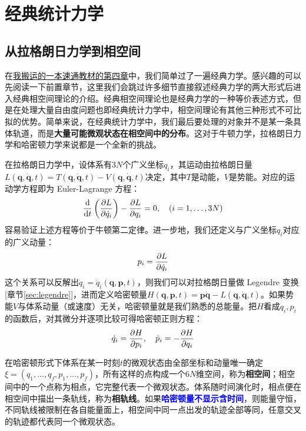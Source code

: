 \section{经典统计力学}
\subsection{从拉格朗日力学到相空间}
在\href{https://github.com/Astolfo-Official/Baby-Math-on-Quantum-Chemistry/blob/main/%E3%80%8A%E9%87%8F%E5%AD%90%E5%8C%96%E5%AD%A6%E4%B8%AD%E7%9A%84%E6%95%B0%E5%AD%A6%E3%80%8B2.0.pdf}{我搬运的一本速通教材的第四章}中，我们简单过了一遍经典力学。感兴趣的可以先阅读一下前置章节，这里我们会跳过许多细节直接叙述经典力学的两大形式后进入经典相空间理论的介绍。经典相空间理论也是经典力学的一种等价表述方式，但是在处理大量自由度问题也即经典统计力学中，相空间理论有其他三种形式不可比拟的优势。简单来说，在经典统计力学中，我们最后要处理的对象并不是某一条具体轨道，而是\textbf{大量可能微观状态在相空间中的分布}。这对于牛顿力学，拉格朗日力学和哈密顿力学来说都是一个全新的挑战。

在拉格朗日力学中，设体系有$3N$个广义坐标$q_i$，其运动由拉格朗日量$L(\bm{q},\dot{\bm{q}},t)=T(\bm{q},\dot{\bm{q}},t)-V(\bm{q},\dot{\bm{q}},t)$决定，其中$T$是动能，$V$是势能。对应的运动学方程即为 Euler-Lagrange 方程：
\[\dv{}{t}\left(\pdv{L}{\dot{q}_i}\right)-\pdv{L}{q_i}=0,\quad (i=1,\ldots,3N)\]
容易验证上述方程等价于牛顿第二定律。进一步地，我们还定义与广义坐标$q_i$对应的广义动量：
\[p_i=\pdv{L}{\dot{q}_i}\]
这个关系可以反解出$\dot{q}_i=\dot{q}_i(\bm{q},\bm{p},t)$，则我们可以对拉格朗日量做 Legendre 变换 [章节\ref{sec:legendre}]，进而定义哈密顿量$H(\bm{q},\bm{p},t)=\bm{p}\dot{\bm{q}}-L(\bm{q},\dot{\bm{q}},t)$。如果势能$V$与体系动量（或速度）无关，哈密顿量就是我们熟悉的总能量。把$H$看成$q_i,p_i$的函数后，对其微分并逐项比较可得哈密顿正则方程：
\[\dot{q}_i=\pdv{H}{p_i},\quad \dot{p}_i=-\pdv{H}{q_i}\]

在哈密顿形式下体系在某一时刻$t$的微观状态由全部坐标和动量唯一确定$\xi=(q_1,\ldots,q_f,p_1,\ldots,p_f)$，所有这样的点构成一个$6N$维空间，称为\textbf{相空间}；相空间中的一个点称为相点，它完整代表一个微观状态。体系随时间演化时，相点便在相空间中描出一条轨线，称为\textbf{相轨线}。如果\textcolor{blue}{\textbf{哈密顿量不显示含时间}}，则能量守恒，不同轨线被限制在各自能量面上，相空间中同一点出发的轨迹全部等同，任意交叉的轨迹都代表同一个微观状态。

